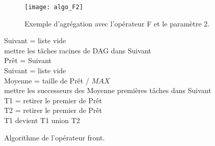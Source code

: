 \begin{figure}
  \centering
  \texttt{[image: algo\_F2]}
  \caption{Exemple d'agrégation avec l'opérateur F et le paramètre 2.}
  \label{fig:algo_F2}
\end{figure}
\begin{algorithm}
  {\sc Suivant} = liste vide \\
  mettre les tâches racines de DAG dans {\sc Suivant} \\
   {
    {\sc Prêt} = {\sc Suivant} \\
    {\sc Suivant} = liste vide \\
    {\sc Moyenne} = taille de {\sc Prêt} / $MAX$ \\
     {
      mettre les successeurs des {\sc Moyenne} premières tâches dans {\sc Suivant} \\
      {\sc T1} = retirer le premier de {\sc Prêt} \\
       {
        {\sc T2} = retirer le premier de {\sc Prêt} \\
        {\sc T1} devient {\sc T1} union {\sc T2}
      }
    }
  }
  \caption{Algorithme de l'opérateur front.}
  \label{algo:algo_F}
\end{algorithm}
